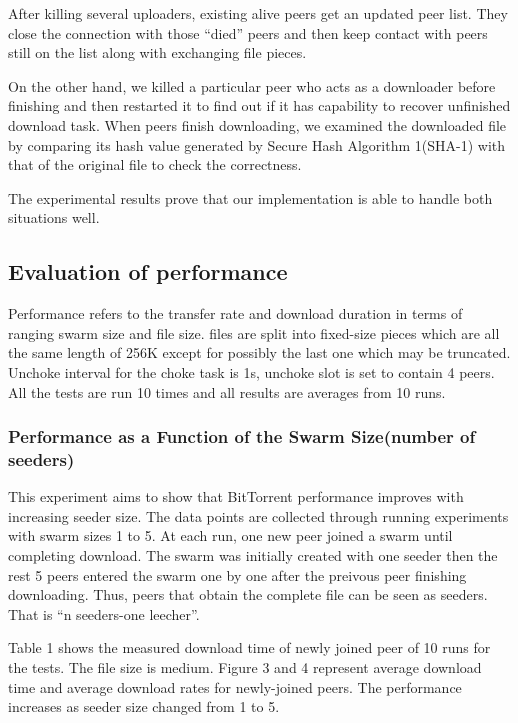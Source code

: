 \documentclass[conference]{IEEEtran}
\begin{document}
	After killing several uploaders, existing alive peers get an updated peer list. They close the connection with those “died” peers and then keep contact with peers still on the list along with exchanging file pieces. 
	
	On the other hand, we killed a particular peer who acts as a downloader before finishing and then restarted it to find out if it has capability to recover unfinished download task.
	When peers finish downloading, we examined the downloaded file by comparing its hash value generated by Secure Hash Algorithm 1(SHA-1) with that of the original file to check the correctness.
	
	The experimental results prove that our implementation is able to handle both situations well.

	
	
	
	
	\subsection{Evaluation of  performance}
	Performance refers to the transfer rate and download duration in terms of ranging swarm size and file size. files are split into fixed-size pieces which are all the same length of 256K except for possibly the last one which may be truncated. Unchoke interval for the choke task is 1s, unchoke slot is set to contain 4 peers. All the tests are run 10 times and all results are averages from 10 runs. 
	
	\subsubsection{Performance as a Function of the Swarm Size(number of seeders)}
	This experiment aims to show that BitTorrent performance improves with increasing seeder size. The data points are collected through running experiments with swarm sizes 1 to 5. At each run, one new peer joined a swarm until completing download. The swarm was initially created with one seeder then the rest 5 peers entered the swarm one by one after the preivous peer finishing downloading. Thus, peers that obtain the complete file can be seen as seeders. That is ``n seeders-one leecher''. 
	
	Table 1 shows the measured download time of newly joined peer of 10 runs for the tests. The file size is medium. Figure 3 and 4 represent average download time and average download rates for newly-joined peers. The performance increases as seeder size changed from 1 to 5. 
	
\end{document}

